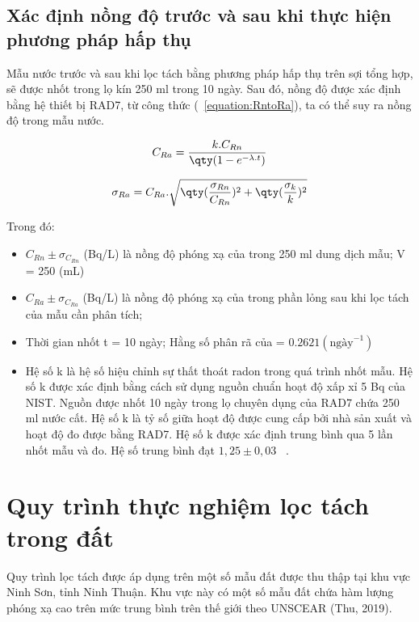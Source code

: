 

    \subsection{Xác định nồng độ  trước và sau khi thực hiện phương pháp hấp thụ }

    Mẫu nước trước và sau khi lọc tách bằng phương pháp hấp thụ  trên sợi tổng hợp, sẽ được nhốt trong lọ kín 250 ml trong 10 ngày. Sau đó, nồng độ  được xác định bằng hệ thiết bị RAD7,  từ công thức (~\ref{equation:RntoRa}), ta có thể suy ra nồng độ   trong mẫu nước.

        \begin{equation}
            C_{Ra} = \dfrac{k.C_{Rn}}{\qty(1-e^{-\lambda.t})}
            \label{equation:RntoRa}
        \end{equation}

        \begin{equation}
            \sigma_{Ra} = C_{Ra}.\sqrt{\qty(\dfrac{\sigma_{Rn}}{C_{Rn}})^2 + \qty(\dfrac{\sigma_{k}}{k})^2 }
        \end{equation}

Trong đó:
\begin{itemize}
    \item  $C_{Rn} \pm \sigma_{C_{Rn}}$  (Bq/L) là nồng độ phóng xạ của  trong 250 ml dung dịch mẫu;  V = 250 (mL)
    \item $C_{Ra} \pm \sigma_{C_{Ra}}$ (Bq/L) là nồng độ phóng xạ của  trong phần lỏng sau khi lọc tách  của mẫu cần phân tích;
    \item Thời gian nhốt t = 10 ngày; Hằng số phân rã của  = $0.2621 (\text{ngày}^{-1})$
    \item Hệ số k là hệ số hiệu chỉnh sự thất thoát radon trong quá trình nhốt mẫu. Hệ số k được xác định bằng cách sử dụng nguồn chuẩn  hoạt độ xấp xỉ 5 Bq của NIST. Nguồn được nhốt 10 ngày trong lọ chuyên dụng của RAD7 chứa 250 ml nước cất. Hệ số k là tỷ số giữa hoạt độ được cung cấp bởi nhà sản xuất và hoạt độ đo được bằng RAD7. Hệ số k được xác định trung bình qua 5 lần nhốt mẫu và đo. Hệ số trung bình đạt $1,25 \pm 0,03$ ~\cite{Thesis:HNPThu}. 
    
\end{itemize}

    

\section{ Quy trình thực nghiệm lọc tách  trong đất}
Quy trình lọc tách  được áp dụng trên một số mẫu đất được thu thập tại khu vực Ninh Sơn, tỉnh Ninh Thuận. Khu vực này có một số mẫu đất chứa hàm lượng phóng xạ  cao trên mức trung bình trên thế giới theo UNSCEAR (Thu, 2019).


